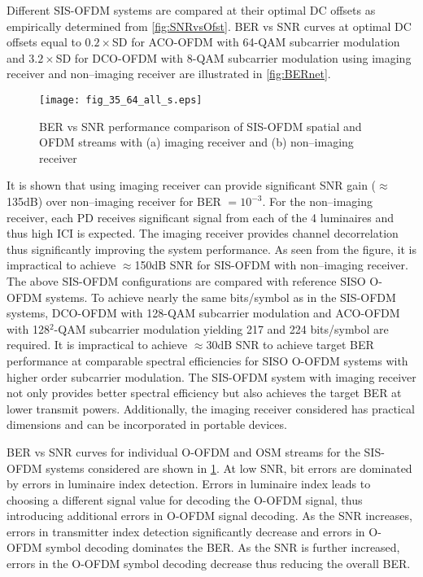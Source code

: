 Different SIS-OFDM systems are compared at their optimal DC offsets as empirically determined from \figurename{ \ref{fig:SNRvsOfst}}. BER vs SNR curves at optimal DC offsets equal to $0.2\times$SD for ACO-OFDM with 64-QAM subcarrier modulation and $3.2\times$SD for DCO-OFDM with 8-QAM subcarrier modulation using imaging receiver and non--imaging receiver are illustrated in \figurename{ \ref{fig:BERnet}}. 
\begin{figure}[!t]
\centering
\texttt{[image: fig\_35\_64\_all\_s.eps]}
\caption[Performance of SIS-OFDM spatial and OFDM streams]{BER vs SNR performance comparison of SIS-OFDM spatial and OFDM streams with (a) imaging receiver and (b) non--imaging receiver}
	\label{fig:BERsplit}
\end{figure}
It is shown that using imaging receiver can provide significant SNR gain ($\approx$135dB) over non--imaging receiver for BER $=10^{-3}$. For the non--imaging receiver, each PD receives significant signal from each of the 4 luminaires and thus high ICI is expected. The imaging receiver provides channel decorrelation thus significantly improving the system performance. As seen from the figure, it is impractical to achieve $\approx$150dB SNR for SIS-OFDM with non--imaging receiver. The above SIS-OFDM configurations are compared with reference SISO O-OFDM systems. To achieve nearly the same bits/symbol as in the SIS-OFDM systems, DCO-OFDM with 128-QAM subcarrier modulation and ACO-OFDM with 128$^2$-QAM subcarrier modulation yielding 217 and 224 bits/symbol are required. It is impractical to achieve $\approx$30dB SNR to achieve target BER performance at comparable spectral efficiencies for SISO O-OFDM systems with higher order subcarrier modulation. The SIS-OFDM system with imaging receiver not only provides better spectral efficiency but also achieves the target BER at lower transmit powers. Additionally, the imaging receiver considered has practical dimensions and can be incorporated in portable devices.

BER vs SNR curves for individual O-OFDM and OSM streams for the SIS-OFDM systems considered are shown in \figurename{\ref{fig:BERsplit}}. At low SNR, bit errors are dominated by errors in luminaire index detection. Errors in luminaire index leads to choosing a different signal value for decoding the O-OFDM signal, thus introducing additional errors in O-OFDM signal decoding. As the SNR increases, errors in transmitter index detection significantly decrease and errors in O-OFDM symbol decoding dominates the BER. As the SNR is further increased, errors in the O-OFDM symbol decoding decrease thus reducing the overall BER.

